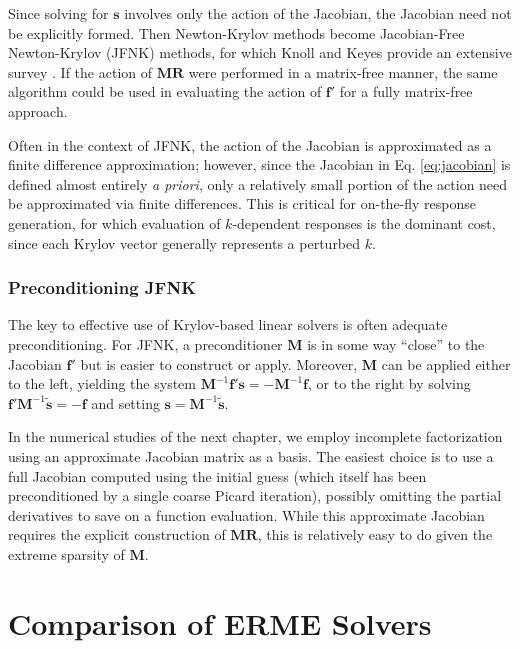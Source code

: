 Since solving for $\mathbf{s}$ involves only the action of the 
Jacobian, the Jacobian need not be explicitly formed.  Then 
Newton-Krylov methods become  Jacobian-Free Newton-Krylov (JFNK) 
methods, for which Knoll and Keyes provide an extensive survey 
\cite{knoll2004jfn}.  If the action of $\mathbf{MR}$ were performed 
in a matrix-free 
manner, the same algorithm could be used in evaluating the 
action of $\mathbf{f}'$ for a fully matrix-free approach.

Often in the context of JFNK, the action 
of the Jacobian is approximated as a finite difference 
approximation; however, since the Jacobian in Eq. \ref{eq:jacobian} 
is defined almost entirely {\it a priori}, only a relatively small 
portion of the action need be approximated via finite differences.  
This is critical for on-the-fly response generation, for which
evaluation of $k$-dependent responses is the dominant cost, since
each Krylov vector generally represents a perturbed $k$.

\subsubsection{Preconditioning JFNK}

The key to effective use of Krylov-based linear solvers is often 
adequate preconditioning.  For JFNK, a preconditioner $\mathbf{M}$ is 
in some way ``close'' to the Jacobian $\mathbf{f}'$ but is easier to 
construct or apply.  Moreover, $\mathbf{M}$ can be applied either 
to the left, yielding the 
system $\mathbf{M}^{-1}\mathbf{f}'\mathbf{s}=-\mathbf{M}^{-1}\mathbf{f}$, or 
to the right by solving 
$\mathbf{f}' \mathbf{M}^{-1} \tilde{\mathbf{s}} = -\mathbf{f}$ and 
setting $\mathbf{s} =  \mathbf{M}^{-1} \tilde{\mathbf{s}} $.

In the numerical studies of the next chapter, we employ incomplete 
factorization using an approximate Jacobian matrix as a basis.  
The easiest choice is to use a full Jacobian computed using the 
initial guess (which itself has been preconditioned by a single 
coarse Picard iteration), possibly omitting the partial derivatives 
to save on a function evaluation.  While this approximate Jacobian 
requires the explicit construction of $\mathbf{MR}$, this is 
relatively easy to do given the extreme sparsity of $\mathbf{M}$.


\section{Comparison of ERME Solvers}
\label{sec:erme_solver_results}


